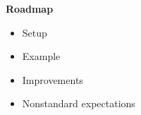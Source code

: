 \begin{frame}

\textbf{Roadmap}\vspace{0.5cm}
\begin{itemize}\setlength\itemsep{1em}
\item Setup
\item Example
\item Improvements
\item Nonstandard expectations
\end{itemize}
\end{frame}
